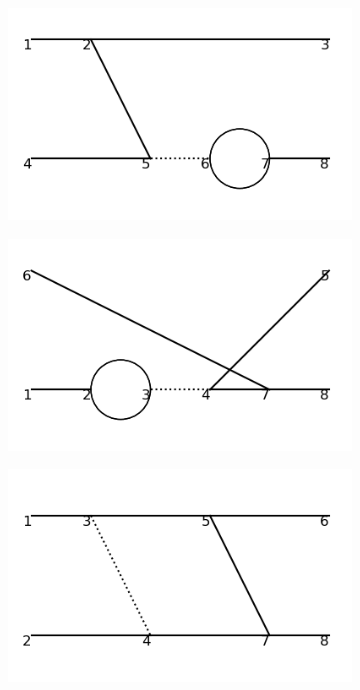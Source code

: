 \documentclass[11pt,a4paper,twoside,pdf]{article}
\numberwithin{equation}{section}
\begin{document}
\begin{figure}[h!]
\begin{subfigure}[t]{0.16\textwidth}
    \end{subfigure}
    \hfill
    \begin{subfigure}[t]{0.16\textwidth}
        \centering
        \includegraphics[width=\textwidth]{plots/order4_2to2/34.png}
    \end{subfigure}
    \hfill
    \begin{subfigure}[t]{0.16\textwidth}
        \centering
        \includegraphics[width=\textwidth]{plots/order4_2to2/35.png}
    \end{subfigure}
    \hfill
    \begin{subfigure}[t]{0.16\textwidth}
        \centering
        \includegraphics[width=\textwidth]{plots/order4_2to2/36.png}
    \end{subfigure}



\end{figure}
\end{document}
